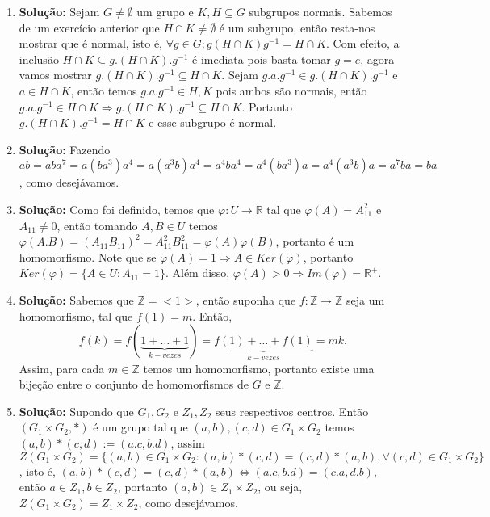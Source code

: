 \documentclass{article}
\begin{document}
\begin{enumerate}
		\item \textbf{Solução:} Sejam $G \neq \emptyset$ um grupo e $K,H \subseteq G$ subgrupos normais. Sabemos de um exercício anterior que $H \cap K \neq \emptyset$ é um subgrupo, então resta-nos mostrar que é normal, isto é, $\forall g \in G; g(H \cap K)g^{-1} = H \cap K$. Com efeito, a inclusão $H \cap K \subseteq g.(H \cap K ).g^{-1}$ é imediata pois basta tomar $g = e$, agora vamos mostrar $g.(H \cap K ).g^{-1}\subseteq H \cap K$.  Sejam $g.a.g^{-1} \in g.(H \cap K ).g^{-1}$ e $a \in H \cap K$, então temos $g.a.g^{-1} \in H, K$ pois ambos são normais, então $g.a.g^{-1} \in H \cap K \Rightarrow g.(H \cap K ).g^{-1} \subseteq H \cap K $. Portanto $g.(H \cap K ).g^{-1}= H \cap K$ e esse subgrupo é normal.
		
		\item \textbf{Solução:} Fazendo $ab = aba^{7} = a(ba^{3})a^{4} = a(a^{3}b)a^{4} = a^{4}ba^{4} = a^{4}(ba^{3})a = a^{4}(a^{3}b)a = a^{7}ba = ba$, como desejávamos.
		
		\item \textbf{Solução:} Como foi definido, temos que $\varphi: U \to \mathbb{R}$ tal que $\varphi(A) = A_{11}^{2}$ e $A_{11} \neq 0$, então tomando $A, B \in U$ temos $\varphi(A.B) = (A_{11}B_{11})^{2} = A_{11}^{2}B_{11}^{2} = \varphi(A)\varphi(B)$, portanto é um homomorfismo. Note que se $\varphi(A)=1 \Rightarrow A \in Ker(\varphi)$, portanto $Ker(\varphi) =\{A \in U: A_{11} = 1\}$. Além disso, $\varphi(A)>0 \Rightarrow Im(\varphi) = \mathbb{R^{+}}$.
		
		\item \textbf{Solução:} Sabemos que $\mathbb{Z} = <1>$, então suponha que $f:\mathbb{Z} \to \mathbb{Z}$ seja um homomorfismo, tal que $f(1)=m$. Então,
		$$
		f(k) = f(\underbrace{1+\dots+1}_{k-vezes})=\underbrace{f(1)+\dots+f(1)}_{k-vezes}= mk.
		$$
		Assim, para cada $m \in \mathbb{Z}$ temos um homomorfismo, portanto existe uma bijeção entre o conjunto de homomorfismos de $G$ e $\mathbb{Z}$.
		
		\item \textbf{Solução:} Supondo que $G_{1}, G_{2}$ e $Z_{1}, Z_{2}$ seus respectivos centros. Então $(G_{1}\times G_{2}, *)$ é um grupo tal que $(a, b), (c, d) \in G_{1}\times G_{2}$ temos $(a,b)*(c,d) := (a.c, b.d)$, assim $Z(G_{1}\times G_{2}) = \{(a, b) \in G_{1}\times G_{2}: (a, b)*(c, d) = (c, d)*(a, b), \forall (c, d) \in G_{1}\times G_{2}\}$, isto é, $(a, b)*(c,d)=(c,d)*(a, b) \iff (a.c, b.d) =(c.a, d.b)$, então $a \in Z_{1}, b \in Z_{2}$, portanto $(a,b) \in Z_{1} \times Z_{2}$, ou seja, $Z(G_{1}\times G_{2}) = Z_{1} \times Z_{2}$, como desejávamos.
		

\end{enumerate}
\end{document}
